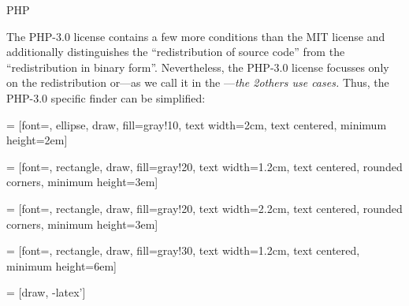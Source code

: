 \begin{license}{PHP} %


The PHP-3.0 license contains a few more conditions than the MIT license and
additionally distinguishes the \enquote{redistribution of source
code}\citePHP{} from the \enquote{redistribution in binary form}.\citePHP{}
Nevertheless, the PHP-3.0 license focusses only on the redistribution or---as we
call it in the \oslic---\emph{the 2others use
cases.} Thus, the PHP-3.0 specific finder can be simplified:

 = [font=\small, ellipse, draw, fill=gray!10, 
    text width=2cm, text centered, minimum height=2em]


 = [font=\footnotesize, rectangle, draw, fill=gray!20, 
    text width=1.2cm, text centered, rounded corners, minimum height=3em]

 = [font=\footnotesize, rectangle, draw, fill=gray!20, 
    text width=2.2cm, text centered, rounded corners, minimum height=3em]
    
 = [font=\tiny, rectangle, draw, fill=gray!30, 
    text width=1.2cm, text centered, minimum height=6em]

 = [draw, -latex']

\end{license}

